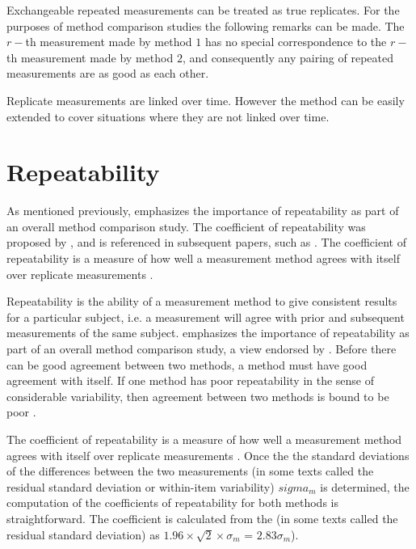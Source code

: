 \documentclass[12pt, a4paper]{report}
\theoremstyle{plain}
\theoremstyle{definition}
\theoremstyle{remark}
\begin{document}
	Exchangeable repeated measurements can be treated as true replicates. For the purposes of method comparison studies the following remarks can be made. The $r-$th measurement made by method $1$ has no special correspondence to the $r-$th measurement made by method $2$, and consequently any pairing of repeated measurements are as good as each other.
	
	
	
	
	Replicate measurements are linked over time. However the method can be easily extended to cover situations where they are not linked over time.
	
	
	
	
	


	\section{Repeatability}
	As mentioned previously, \citet{Barnhart} emphasizes the importance of repeatability as part of an overall method comparison study. The coefficient of repeatability was proposed by \citet{BA99}, and is referenced in subsequent papers, such as \citet{BXC2008}. The coefficient of repeatability is a measure of how well a
	measurement method agrees with itself over replicate measurements
	\citep{BA99}. 
	
	Repeatability is the ability of a measurement method to give consistent results for a particular subject, i.e. a measurement will agree with prior and subsequent measurements of the same subject. \citet{Barnhart} emphasizes the importance of repeatability as part of an overall method comparison study, a view endorsed by \citet{BXC2008}. Before there can be good agreement between two methods, a method must have good agreement with itself. If one method has poor repeatability in the sense of considerable
	variability, then agreement between two methods is bound to be
	poor \citep{ARoy2009}. 
	
	The coefficient of repeatability is a measure of how well a
	measurement method agrees with itself over replicate measurements
	\citep{BA99}. Once the the standard deviations of the differences between the two measurements (in some texts called the residual standard deviation or within-item variability) $sigma_m$ is determined, the
	computation of the coefficients of repeatability for both methods
	is straightforward. The coefficient is calculated from the (in some texts called the residual standard deviation) as  $1.96 \times \sqrt{2} \times \sigma_m$ = $2.83 \sigma_m$).
	
\end{document}
